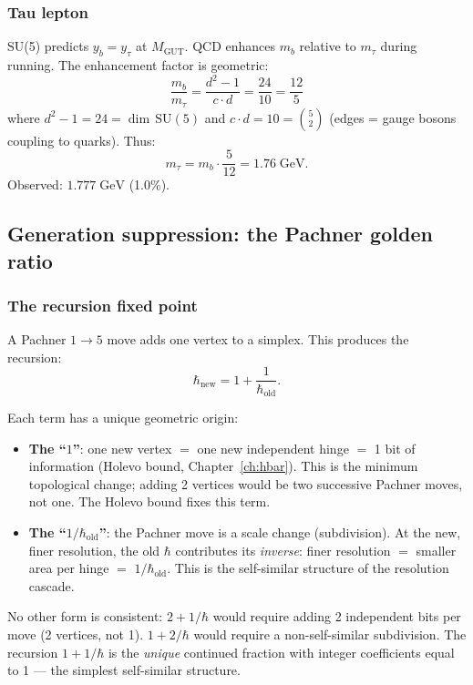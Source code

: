\subsubsection{Tau lepton}

SU(5) predicts $y_b = y_\tau$ at $M_\text{GUT}$. QCD enhances $m_b$ relative to $m_\tau$ during running. The enhancement factor is geometric:
\begin{equation}
\frac{m_b}{m_\tau} = \frac{d^2 - 1}{c \cdot d} = \frac{24}{10} = \frac{12}{5}
\end{equation}
where $d^2 - 1 = 24 = \dim\,\text{SU}(5)$ and $c \cdot d = 10 = \binom{5}{2}$ (edges = gauge bosons coupling to quarks). Thus:
\begin{equation}
m_\tau = m_b \cdot \frac{5}{12} = 1.76\;\text{GeV}.
\end{equation}
Observed: $1.777\;\text{GeV}$ (1.0\%).

\subsection{Generation suppression: the Pachner golden ratio}

\subsubsection{The recursion fixed point}

A Pachner $1 \to 5$ move adds one vertex to a simplex. This produces the recursion:
\begin{equation}
\hbar_\text{new} = 1 + \frac{1}{\hbar_\text{old}}.
\end{equation}

Each term has a unique geometric origin:
\begin{itemize}
\item \textbf{The ``$1$''}: one new vertex $=$ one new independent hinge $=$ 1 bit of information (Holevo bound, Chapter~\ref{ch:hbar}). This is the minimum topological change; adding 2 vertices would be two successive Pachner moves, not one. The Holevo bound fixes this term.
\item \textbf{The ``$1/\hbar_\text{old}$''}: the Pachner move is a scale change (subdivision). At the new, finer resolution, the old $\hbar$ contributes its \emph{inverse}: finer resolution $=$ smaller area per hinge $=$ $1/\hbar_\text{old}$. This is the self-similar structure of the resolution cascade.
\end{itemize}

No other form is consistent: $2 + 1/\hbar$ would require adding 2 independent bits per move (2 vertices, not 1). $1 + 2/\hbar$ would require a non-self-similar subdivision. The recursion $1 + 1/\hbar$ is the \emph{unique} continued fraction with integer coefficients equal to 1 --- the simplest self-similar structure.

